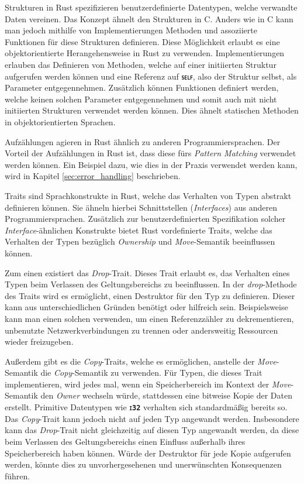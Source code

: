 Strukturen in Rust spezifizieren benutzerdefinierte Datentypen, welche verwandte Daten vereinen. Das Konzept
ähnelt den Strukturen in C. Anders wie in C kann man jedoch mithilfe von Implementierungen Methoden und assoziierte
Funktionen für diese Strukturen definieren.
Diese Möglichkeit erlaubt es eine objektorientierte Herangehensweise in Rust zu verwenden.
Implementierungen erlauben das Definieren von Methoden, welche auf einer initiierten Struktur aufgerufen werden 
können und eine Referenz auf \texttt{\textsc{\textbf{self}}}, also der Struktur selbst, als Parameter entgegennehmen.
Zusätzlich können Funktionen definiert werden, welche keinen solchen Parameter entgegennehmen und somit auch mit
nicht initiierten Strukturen verwendet werden können. Dies ähnelt statischen Methoden in objektorientierten
Sprachen.\cite{rustBook}

Aufzählungen agieren in Rust ähnlich zu anderen Programmiersprachen. Der Vorteil der Aufzählungen in Rust ist, dass
diese fürs \textit{Pattern Matching} verwendet werden können. Ein Beispiel dazu, wie dies in der Praxis verwendet
werden kann, wird in Kapitel \ref{sec:error_handling} beschrieben.
\cite{rustBook}

Traits sind Sprachkonstrukte in Rust, welche das Verhalten von Typen abstrakt definieren können. Sie ähneln 
hierbei Schnittstellen (\textit{Interfaces}) aus anderen Programmiersprachen.
Zusätzlich zur benutzerdefinierten Spezifikation
solcher \textit{Interface}-ähnlichen Konstrukte bietet Rust vordefinierte Traits, welche das Verhalten der Typen
bezüglich \textit{Ownership} und \textit{Move}-Semantik beeinflussen können.\cite{rustBook}

Zum einen existiert das \textit{Drop}-Trait. Dieses Trait erlaubt es, das Verhalten eines Typen beim Verlassen des
Geltungsbereichs zu beeinflussen. In der \textit{drop}-Methode des Traits wird es ermöglicht, einen Destruktor
für den Typ zu definieren. Dieser kann aus unterschiedlichen Gründen benötigt oder hilfreich sein.
Beispielsweise kann man einen solchen verwenden, 
um einen Referenzzähler zu dekrementieren, unbenutzte Netzwerkverbindungen
zu trennen oder andersweitig Ressourcen wieder freizugeben.\cite{rustBook}

Außerdem gibt es die \textit{Copy}-Traits, welche es ermöglichen, anstelle der \textit{Move}-Semantik die
\textit{Copy}-Semantik zu verwenden. Für Typen, die dieses Trait implementieren, wird jedes mal, wenn ein
Speicherbereich im Kontext der \textit{Move}-Semantik den \textit{Owner} wechseln würde,
stattdessen eine bitweise Kopie der Daten erstellt. Primitive Datentypen wie \texttt{\textsc{\textbf{i32}}}
verhalten sich standardmäßig bereits so. Das \textit{Copy}-Trait kann jedoch nicht auf jeden Typ
angewandt werden. Insbesondere kann das \textit{Drop}-Trait nicht gleichzeitig auf diesen Typ angewandt werden,
da diese beim Verlassen des Geltungsbereichs einen Einfluss außerhalb ihres Speicherbereich haben können.
Würde der Destruktor für jede Kopie aufgerufen werden, könnte dies zu unvorhergesehenen und
unerwünschten Konsequenzen führen.\cite{rustBook}\cite{rustDocCopy}

